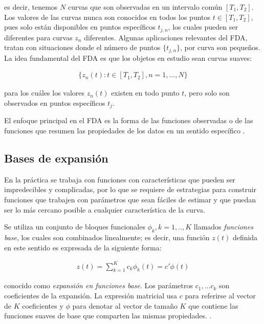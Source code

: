 \documentclass[
]{book}
\begin{document}
es decir, tenemos \(N\) curvas que son observadas en un intervalo común \([T_1,T_2]\). Los valores de las curvas nunca son conocidos en todos los puntos \(t\in[T_1,T_2]\), pues solo están disponibles en puntos específicos \(t_{j,n}\), los cuales pueden ser diferentes para curvas \(z_n\) diferentes. Algunas aplicaciones relevantes del FDA, tratan con situaciones donde el número de puntos \(\{t_{j,n}\}\), por curva son pequeños. La idea fundamental del FDA es que los objetos en estudio sean curvas suaves:

\begin{align}
    \{z_n(t):t\in[T_1,T_2],n=1,...,N\}
\end{align}

para los cuáles los valores \(z_n(t)\) existen en todo punto \(t\), pero solo son observados en puntos específicos \(t_j\).

El enfoque principal en el FDA es la forma de las funciones observadas o de las funciones que resumen las propiedades de los datos en un sentido específico \citep{kokoska}.

\hypertarget{bases-de-expansiuxf3n}{%
\subsection*{Bases de expansión}\label{bases-de-expansiuxf3n}}

En la práctica se trabaja con funciones con características que pueden ser impredecibles y complicadas, por lo que se requiere de estrategias para construir funciones que trabajen con parámetros que sean fáciles de estimar y que puedan ser lo más cercano posible a cualquier característica de la curva.

Se utiliza un conjunto de bloques funcionales \(\phi_k,k=1,..,K\) llamados \emph{funciones base}, los cuales son combinados linealmente; es decir, una función \(z(t)\) definida en este sentido es expresada de la siguiente forma:

\begin{align}
    z(t)=\sum_{k=1}^Kc_k\phi_k(t)=c'\phi(t)
\end{align}

conocido como \emph{expansión en funciones base}. Los parámetros \(c_1,...c_k\) son coeficientes de la expansión. La expresión matricial usa \(c\) para referirse al vector de \(K\) coeficientes y \(\phi\) para denotar al vector de tamaño \(K\) que contiene las funciones suaves de base que comparten las mismas propiedades. \citep{programsay}.
\end{document}
